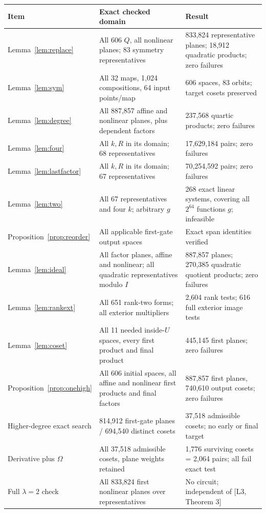 \documentclass[11pt,a4paper]{article}
\begin{document}
\begin{center}\small
\begin{tabularx}{\textwidth}{@{}l X X@{}}\toprule
Item & Exact checked domain & Result\\\midrule
Lemma~\ref{lem:replace} & All 606 $Q$, all nonlinear planes; 83 symmetry representatives & 833,824 representative planes; 18,912 quadratic products; zero failures\\
Lemma~\ref{lem:sym} & All 32 maps, 1,024 compositions, 64 input points/map & 606 spaces, 83 orbits; target cosets preserved\\
Lemma~\ref{lem:degree} & All 887,857 affine and nonlinear planes, plus dependent factors & 237,568 quartic products; zero failures\\
Lemma~\ref{lem:four} & All $k,R$ in its domain; 68 representatives & 17,629,184 pairs; zero failures\\
Lemma~\ref{lem:lastfactor} & All $k,R$ in its domain; 67 representatives & 70,254,592 pairs; zero failures\\
Lemma~\ref{lem:two} & All 67 representatives and four $k$; arbitrary $g$ & 268 exact linear systems, covering all $2^{64}$ functions $g$; infeasible\\
Proposition~\ref{prop:reorder} & All applicable first-gate output spaces & Exact span identities verified\\
Lemma~\ref{lem:ideal} & All factor planes, affine and nonlinear; all quadratic representatives modulo $I$ & 887,857 planes; 270,385 quadratic quotient products; zero failures\\
Lemma~\ref{lem:rankext} & All 651 rank-two forms; all exterior multipliers & 2,604 rank tests; 616 full exterior image tests\\
Lemma~\ref{lem:coset} & All 11 needed inside-$U$ spaces, every first product and final product & 445,145 first planes; zero failures\\
Proposition~\ref{prop:onehigh} & All 606 initial spaces, all affine and nonlinear first products and final factors & 887,857 first planes, 740,610 output cosets; zero failures\\
Higher-degree exact search & 814,912 first-gate planes / 694,540 distinct cosets & 37,518 admissible cosets; no early or final target\\
Derivative plus $\Omega$ & All 37,518 admissible cosets, plane weights retained & 1,776 surviving cosets = 2,064 pairs; all fail exact test\\
Full $\lambda=2$ check & All 833,824 first nonlinear planes over representatives & No circuit; independent of [L3, Theorem 3]\\\bottomrule
\end{tabularx}\end{center}
\end{document}
